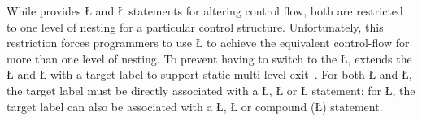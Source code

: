 \documentclass[openright,twoside]{report}
\begin{document}
While \CC provides \LGinlinetrue\LGbegin\lgrinde\L{}\endlgrinde\LGend{} and \LGinlinetrue\LGbegin\lgrinde\L{}\endlgrinde\LGend{} statements for altering control flow, both are restricted to one level of nesting for a particular control structure.
Unfortunately, this restriction forces programmers to use \LGinlinetrue\LGbegin\lgrinde\L{}\endlgrinde\LGend{} to achieve the equivalent control-flow for more than one level of nesting.
To prevent having to switch to the \LGinlinetrue\LGbegin\lgrinde\L{}\endlgrinde\LGend{}, \uC extends the \LGinlinetrue\LGbegin\lgrinde\L{}\endlgrinde\LGend{} and \LGinlinetrue\LGbegin\lgrinde\L{}\endlgrinde\LGend{} with a target label to support static multi-level exit~\cite{Buhr85,Java}.
For both \LGinlinetrue\LGbegin\lgrinde\L{}\endlgrinde\LGend{} and \LGinlinetrue\LGbegin\lgrinde\L{}\endlgrinde\LGend{}, the target label must be directly associated with a \LGinlinetrue\LGbegin\lgrinde\L{}\endlgrinde\LGend{}, \LGinlinetrue\LGbegin\lgrinde\L{}\endlgrinde\LGend{} or \LGinlinetrue\LGbegin\lgrinde\L{}\endlgrinde\LGend{} statement;
for \LGinlinetrue\LGbegin\lgrinde\L{}\endlgrinde\LGend{}, the target label can also be associated with a \LGinlinetrue\LGbegin\lgrinde\L{}\endlgrinde\LGend{}, \LGinlinetrue\LGbegin\lgrinde\L{}\endlgrinde\LGend{} or compound (\LGinlinetrue\LGbegin\lgrinde\L{\LB{\{\,\}}}\endlgrinde\LGend{}) statement.
\end{document}
